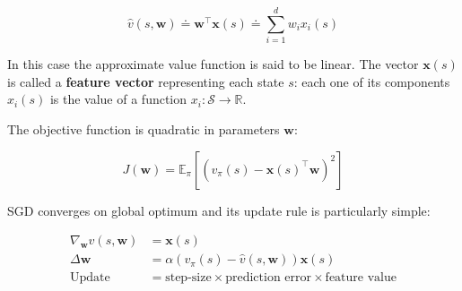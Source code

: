 \[
    \hat{v}(s, \mathbf{w}) \doteq \mathbf{w}^\top \mathbf{x}(s) \doteq \sum_{i=1}^{d} w_i x_i(s)
\]

In this case the approximate value function is said to be linear. The vector $\mathbf{x}(s)$ is called a \textbf{feature vector} representing each state $s$: each one of its components $x_i(s)$ is the value of a function $x_i : \mathcal{S} \to \mathbb{R}$.

The objective function is quadratic in parameters $\mathbf{w}$:

\[
    J(\mathbf{w}) = \mathbb{E}_\pi \left[ ( v_\pi(s) - \mathbf{x}(s)^\top \mathbf{w} )^2 \right]
\]

SGD converges on global optimum and its update rule is particularly simple:

\begin{align*}
    \nabla_{\mathbf{w}} \hat{v}(s,\mathbf{w}) &= \mathbf{x}(s) \\
    \Delta \mathbf{w} &= \alpha \left( v_\pi(s) - \hat{v}(s,\mathbf{w}) \right) \mathbf{x}(s) \\
    \text{Update} &= \text{step-size} \times \text{prediction error} \times \text{feature value}
\end{align*}

